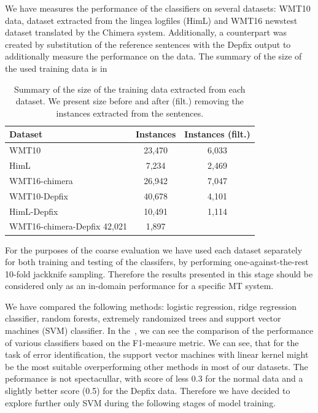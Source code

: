 We have measures the performance of the classifiers on several datasets:
WMT10 data, dataset extracted from the lingea logfiles (HimL) and
WMT16 newstest dataset translated by the Chimera system.
Additionally, a counterpart was
created by substitution of the reference sentences with the Depfix output
to additionally measure the performance on the  data.
The summary of the size of the used training data is in~

\begin{table}[t]
\centering
\small

\begin{tabular}{lcc}
Dataset  &  \hash{} Instances  &  \hash{} Instances (filt.)  \\
\hline
WMT10  &  23,470  &  6,033  \\
HimL  & 7,234  &  2,469  \\
WMT16-chimera  &  26,942  &  7,047  \\
WMT10-Depfix  &  40,678  &  4,101  \\
HimL-Depfix  &  10,491  &  1,114  \\
WMT16-chimera-Depfix  42,021  &  1,897  \\
\end{tabular}
\caption{
    Summary of the size of the training data extracted from each dataset. We present
size before and after (filt.) removing the instances extracted from the  sentences.
}
\label{wf-training-sum}
\end{table}


For the purposes of the coarse evaluation we have used each dataset separately for both training
and testing of the classifers, by performing one-against-the-rest 10-fold jackknife sampling.
Therefore the results presented in this stage should be considered only as an in-domain
performance for a specific MT system.

We have compared the following methods: logistic regression, ridge regression classifier,
random forests, extremely randomized trees and support vector machines (SVM) classifier.
In the~, we can see the comparison of the performance of various classifiers based
on the F1-measure metric. We can see, that for the task of error identification, the support vector
machines with linear kernel might be the most suitable overperforming other methods in most of our
datasets. The  peformance is not spectacullar, with score of less 0.3 for the normal data
and a slightly better score (\tilda{}0.5) for the Depfix data. Therefore we have decided to explore
further only SVM during the following stages of model training.

